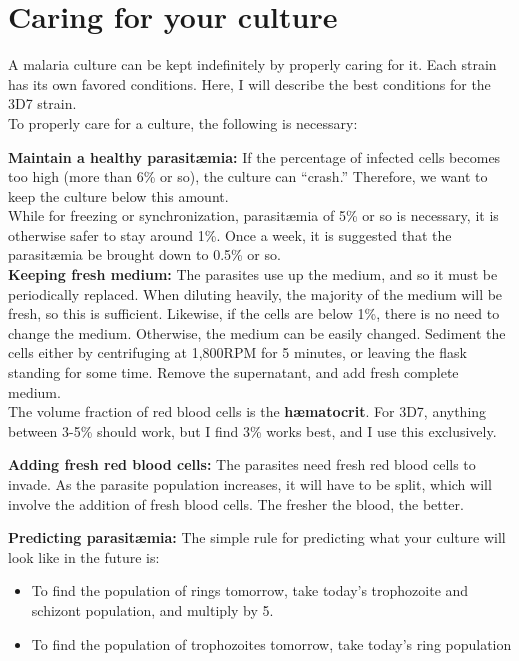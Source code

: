 \documentclass{article}
\begin{document}
\newpage
\section{Caring for your culture}

A malaria culture can be kept indefinitely by properly caring for it. Each strain has its own favored conditions. Here, I will describe the best conditions for the 3D7 strain.\\

To properly care for a culture, the following is necessary:

\textbf{Maintain a healthy parasit{\ae}mia:}
If the percentage of infected cells becomes too high (more than 6\% or so), the culture can ``crash.'' Therefore, we want to keep the culture below this amount.\\

While for freezing or synchronization, parasit{\ae}mia of 5\% or so is necessary, it is otherwise safer to stay around 1\%. Once a week, it is suggested that the parasit{\ae}mia be brought down to 0.5\% or so.\\

\textbf{Keeping fresh medium:}
The parasites use up the medium, and so it must be periodically replaced. When diluting heavily, the majority of the medium will be fresh, so this is sufficient. Likewise, if the cells are below 1\%, there is no need to change the medium. Otherwise, the medium can be easily changed. Sediment the cells either by centrifuging at 1,800RPM for 5 minutes, or leaving the flask standing for some time. Remove the supernatant, and add fresh complete medium.\\

The volume fraction of red blood cells is the \textbf{h{\ae}matocrit}. For 3D7, anything between 3-5\% should work, but I find 3\% works best, and I use this exclusively.

\textbf{Adding fresh red blood cells:}
The parasites need fresh red blood cells to invade. As the parasite population increases, it will have to be split, which will involve the addition of fresh blood cells. The fresher the blood, the better. 

\textbf{Predicting parasit{\ae}mia:}
The simple rule for predicting what your culture will look like in the future is:
\begin{itemize}
	\item To find the population of rings tomorrow, take today's trophozoite and schizont population, and multiply by 5.
	\item To find the population of trophozoites tomorrow, take today's ring population
\end{itemize}
\end{document}
